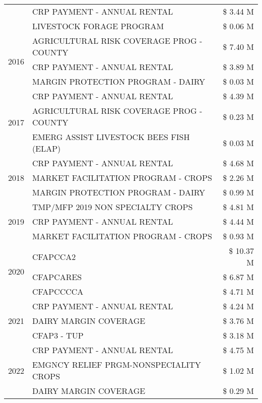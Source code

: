 \begin{tabular}{llr}
 & CRP PAYMENT - ANNUAL RENTAL & \$ 3.44 M \\
 & LIVESTOCK FORAGE PROGRAM & \$ 0.06 M \\
\cline{1-3}
\multirow[t]{3}{*}{2016} & AGRICULTURAL RISK COVERAGE PROG - COUNTY & \$ 7.40 M \\
 & CRP PAYMENT - ANNUAL RENTAL & \$ 3.89 M \\
 & MARGIN PROTECTION PROGRAM - DAIRY & \$ 0.03 M \\
\cline{1-3}
\multirow[t]{3}{*}{2017} & CRP PAYMENT - ANNUAL RENTAL & \$ 4.39 M \\
 & AGRICULTURAL RISK COVERAGE PROG - COUNTY & \$ 0.23 M \\
 & EMERG ASSIST LIVESTOCK BEES FISH (ELAP) & \$ 0.03 M \\
\cline{1-3}
\multirow[t]{3}{*}{2018} & CRP PAYMENT - ANNUAL RENTAL & \$ 4.68 M \\
 & MARKET FACILITATION PROGRAM - CROPS & \$ 2.26 M \\
 & MARGIN PROTECTION PROGRAM - DAIRY & \$ 0.99 M \\
\cline{1-3}
\multirow[t]{3}{*}{2019} & TMP/MFP 2019 NON SPECIALTY CROPS & \$ 4.81 M \\
 & CRP PAYMENT - ANNUAL RENTAL & \$ 4.44 M \\
 & MARKET FACILITATION PROGRAM - CROPS & \$ 0.93 M \\
\cline{1-3}
\multirow[t]{3}{*}{2020} & CFAPCCA2 & \$ 10.37 M \\
 & CFAPCARES & \$ 6.87 M \\
 & CFAPCCCCA & \$ 4.71 M \\
\cline{1-3}
\multirow[t]{3}{*}{2021} & CRP PAYMENT - ANNUAL RENTAL & \$ 4.24 M \\
 & DAIRY MARGIN COVERAGE & \$ 3.76 M \\
 & CFAP3 - TUP & \$ 3.18 M \\
\cline{1-3}
\multirow[t]{3}{*}{2022} & CRP PAYMENT - ANNUAL RENTAL & \$ 4.75 M \\
 & EMGNCY RELIEF PRGM-NONSPECIALITY CROPS & \$ 1.02 M \\
 & DAIRY MARGIN COVERAGE & \$ 0.29 M \\
\cline{1-3}
\bottomrule
\end{tabular}
